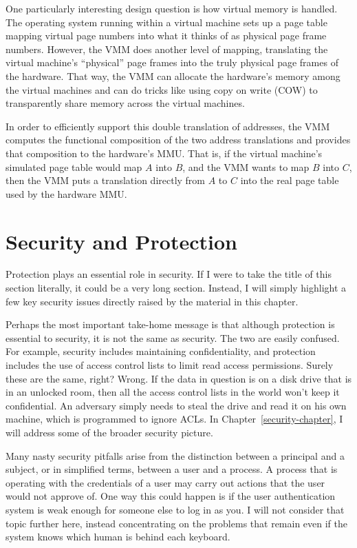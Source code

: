 One particularly interesting design question is how virtual memory is
handled.  The operating system running within a virtual machine sets
up a page table mapping virtual page numbers into what it thinks of as
physical page frame numbers.  However, the VMM does another level of
mapping, translating the virtual machine's ``physical'' page frames
into the truly physical page frames of the hardware.  That way, the
VMM can allocate the hardware's memory among the virtual machines and
can do tricks like using copy on write (COW) to transparently share
memory across the virtual machines.

In order to efficiently support this double translation of addresses,
the VMM computes the functional composition of the two address
translations and provides that composition to the hardware's MMU.
That is, if the virtual machine's simulated page table would map $A$
into $B$, and the VMM wants to map $B$ into $C$, then the VMM puts a
translation directly from $A$ to $C$ into the real page table used by
the hardware MMU.

\section{Security and Protection}
\label{securityAndProtectionSection}
Protection plays an essential role in security.  If I were to take
the title of this section literally, it could be a very long section.
Instead, I will simply highlight a few key security issues directly
raised by the material in this chapter.

Perhaps the most important take-home message is that although
protection is essential to security, it is not the same as security.
The two are easily confused.  For example, security includes
maintaining confidentiality, and protection includes the use of access
control lists to limit read access permissions.  Surely these are the
same, right?  Wrong.  If the data in question is
on a disk drive that is in an unlocked room, then all the access
control lists in the world won't keep it confidential.  An adversary
simply needs to steal the drive and read it on his own machine, which
is programmed to ignore ACLs.  In Chapter~\ref{security-chapter}, I
will address some of the broader security picture.

Many nasty security pitfalls arise from the distinction between a
principal and a subject, or in simplified terms, between a
user and a process.  A process that is operating with the credentials
of a user may carry out actions that the user would not approve of.
One way this could happen is if the user authentication system is weak
enough for someone else to log in as you.  I will not consider that
topic further here, instead concentrating on the problems that remain
even if the system knows which human is behind each keyboard.

